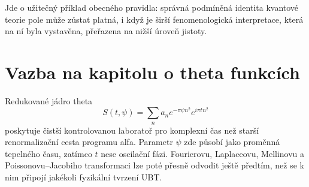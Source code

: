 Jde o užitečný příklad obecného pravidla: správná podmíněná identita kvantové
teorie pole může zůstat platná, i když je širší fenomenologická interpretace,
která na ní byla vystavěna, přeřazena na nižší úroveň jistoty.

\section{Vazba na kapitolu o theta funkcích}
Redukované jádro theta
\[
 S(t,\psi)=\sum_n a_n e^{-\pi\psi n^2}e^{i\pi t n^2}
\]
poskytuje čistší kontrolovanou laboratoř pro komplexní čas než starší
renormalizační cesta programu alfa. Parametr $\psi$ zde působí jako proměnná
tepelného času, zatímco $t$ nese oscilační fázi. Fourierovu, Laplaceovu,
Mellinovu a Poissonovu--Jacobiho transformaci lze poté přesně odvodit ještě
předtím, než se k nim připojí jakékoli fyzikální tvrzení UBT.
